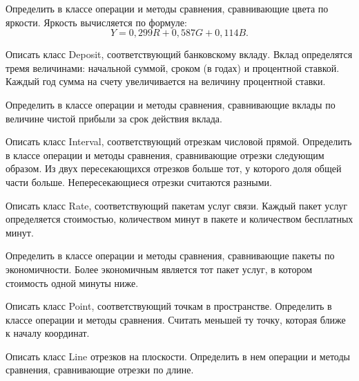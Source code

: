 Определить в классе операции и методы сравнения, сравнивающие цвета по
яркости. Яркость вычисляется по формуле:
\[
Y = 0{,}299 R + 0{,}587 G + 0{,}114 B.
\]

\task Описать класс Deposit, соответствующий банковскому вкладу. Вклад
определятся тремя величинами: начальной суммой, сроком (в годах) и
процентной ставкой. Каждый год сумма на счету увеличивается на
величину процентной ставки.

Определить в классе операции и методы сравнения, сравнивающие вклады
по величине чистой прибыли за срок действия вклада.

\task Описать класс Interval, соответствующий отрезкам числовой
прямой. Определить в классе операции и методы сравнения, сравнивающие
отрезки следующим образом. Из двух пересекающихся отрезков больше тот,
у которого доля общей части больше. Непересекающиеся отрезки считаются
разными.

\task Описать класс Rate, соответствующий пакетам услуг связи. Каждый
пакет услуг определяется стоимостью, количеством минут в пакете и
количеством бесплатных минут.

Определить в классе операции и методы сравнения, сравнивающие пакеты
по экономичности. Более экономичным является тот пакет услуг, в
котором стоимость одной минуты ниже.

\task Описать класс Point, соответствующий точкам в пространстве.
Определить в классе операции и методы сравнения. Считать меньшей ту
точку, которая ближе к началу координат.

\task Описать класс Line отрезков на плоскости. Определить в нем
операции и методы сравнения, сравнивающие отрезки по длине.
